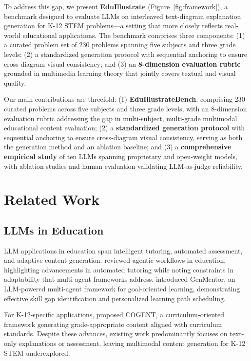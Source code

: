 \documentclass[11pt]{article}
\begin{document}
To address this gap, we present \textbf{EduIllustrate} (Figure~\ref{fig:framework}), a benchmark designed to evaluate LLMs on interleaved text-diagram explanation generation for K-12 STEM problems---a setting that more closely reflects real-world educational applications. The benchmark comprises three components: (1) a curated problem set of 230 problems spanning five subjects and three grade levels; (2) a standardized generation protocol with sequential anchoring to ensure cross-diagram visual consistency; and (3) an \textbf{8-dimension evaluation rubric} grounded in multimedia learning theory that jointly covers textual and visual quality.

Our main contributions are threefold: (1) \textbf{EduIllustrateBench}, comprising 230 curated problems across five subjects and three grade levels, with an 8-dimension evaluation rubric addressing the gap in multi-subject, multi-grade multimodal educational content evaluation; (2) a \textbf{standardized generation protocol} with sequential anchoring to ensure cross-diagram visual consistency, serving as both the generation method and an ablation baseline; and (3) a \textbf{comprehensive empirical study} of ten LLMs spanning proprietary and open-weight models, with ablation studies and human evaluation validating LLM-as-judge reliability.



\section{Related Work}


\subsection{LLMs in Education}

LLM applications in education span intelligent tutoring, automated assessment, and adaptive content generation. \citet{kamalov2025agentic} reviewed agentic workflows in education, highlighting advancements in automated tutoring while noting constraints in adaptability that multi-agent frameworks address. \citet{wang2025genmentor} introduced GenMentor, an LLM-powered multi-agent framework for goal-oriented learning, demonstrating effective skill gap identification and personalized learning path scheduling.

For K-12-specific applications, \citet{liu2025cogent} proposed COGENT, a curriculum-oriented framework generating grade-appropriate content aligned with curriculum standards. Despite these advances, existing work predominantly focuses on text-only explanations or assessment, leaving multimodal content generation for K-12 STEM underexplored.
\end{document}
